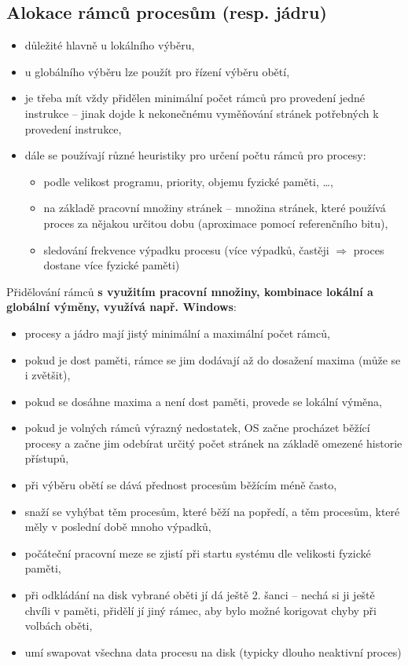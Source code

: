 \documentclass[a4paper, 11pt]{article}
\begin{document}
\subsection{Alokace rámců procesům (resp. jádru)}
\begin{itemize}
    \item důležité hlavně u lokálního výběru,
    \item u globálního výběru lze použít pro řízení výběru obětí,
    \item je třeba mít vždy přidělen minimální počet rámců pro provedení jedné instrukce -- jinak dojde k nekonečnému vyměňování stránek potřebných k provedení instrukce,
    \item dále se používají různé heuristiky pro určení počtu rámců pro procesy:
    \begin{itemize}
        \item podle velikost programu, priority, objemu fyzické paměti, \ldots,
        \item na základě pracovní množiny stránek -- množina stránek, které používá proces za nějakou určitou dobu (aproximace pomocí referenčního bitu),
        \item sledování frekvence výpadku procesu (více výpadků, častěji $\Rightarrow$ proces dostane více fyzické paměti)
    \end{itemize}
\end{itemize}
 
Přidělování rámců \textbf{s využitím pracovní množiny, kombinace lokální a globální výměny, využívá např. Windows}:
\begin{itemize}
    \item procesy a jádro mají jistý minimální a maximální počet rámců,
    \item pokud je dost paměti, rámce se jim dodávají až do dosažení maxima (může se i zvětšit),
    \item pokud se dosáhne maxima a není dost paměti, provede se lokální výměna,
    \item pokud je volných rámců výrazný nedostatek, OS začne procházet běžící procesy a začne jim odebírat určitý počet stránek na základě omezené historie přístupů,
    \item při výběru obětí se dává přednost procesům běžícím méně často,
    \item snaží se vyhýbat těm procesům, které běží na popředí, a těm procesům, které měly v poslední době mnoho výpadků,
    \item počáteční pracovní meze se zjistí při startu systému dle velikosti fyzické paměti,
    \item při odkládání na disk vybrané oběti jí dá ještě 2. šanci -- nechá si ji ještě chvíli v paměti, přidělí jí jiný rámec, aby bylo možné korigovat chyby při volbách oběti,
    \item umí swapovat všechna data procesu na disk (typicky dlouho neaktivní proces)
\end{itemize}
\end{document}
